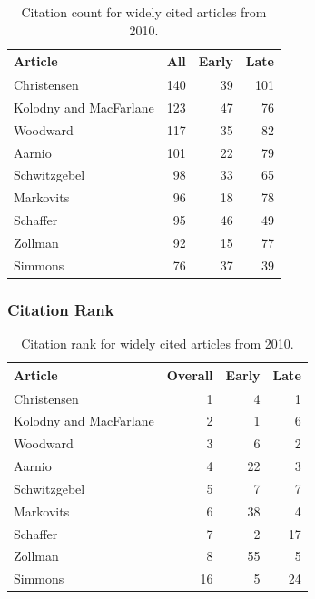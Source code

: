 \documentclass[
  10pt,
  letterpaper,
  DIV=11,
  numbers=noendperiod,
  twoside]{scrartcl}
\begin{document}
\begin{longtable}[]{@{}lrrr@{}}

\caption{\label{tbl-citation-count-2010}Citation count for widely cited
articles from 2010.}

\tabularnewline

\toprule\noalign{}
Article & All & Early & Late \\
\midrule\noalign{}
\endhead
\bottomrule\noalign{}
\endlastfoot
Christensen & 140 & 39 & 101 \\
Kolodny and MacFarlane & 123 & 47 & 76 \\
Woodward & 117 & 35 & 82 \\
Aarnio & 101 & 22 & 79 \\
Schwitzgebel & 98 & 33 & 65 \\
Markovits & 96 & 18 & 78 \\
Schaffer & 95 & 46 & 49 \\
Zollman & 92 & 15 & 77 \\
Simmons & 76 & 37 & 39 \\

\end{longtable}

\subsubsection*{Citation Rank}\label{sec-rank-2010}

\begin{longtable}[]{@{}lrrr@{}}

\caption{\label{tbl-citation-rank-2010}Citation rank for widely cited
articles from 2010.}

\tabularnewline

\toprule\noalign{}
Article & Overall & Early & Late \\
\midrule\noalign{}
\endhead
\bottomrule\noalign{}
\endlastfoot
Christensen & 1 & 4 & 1 \\
Kolodny and MacFarlane & 2 & 1 & 6 \\
Woodward & 3 & 6 & 2 \\
Aarnio & 4 & 22 & 3 \\
Schwitzgebel & 5 & 7 & 7 \\
Markovits & 6 & 38 & 4 \\
Schaffer & 7 & 2 & 17 \\
Zollman & 8 & 55 & 5 \\
Simmons & 16 & 5 & 24 \\

\end{longtable}
\end{document}
